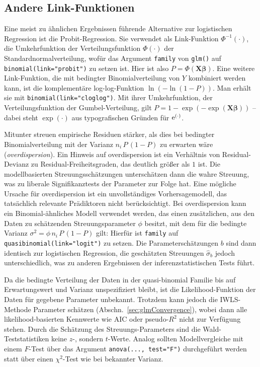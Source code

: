 \subsection{Andere Link-Funktionen}
\label{sec:glmOtherLink}

Eine meist zu ähnlichen Ergebnissen führende Alternative zur logistischen Regression ist die Probit-Regression. Sie verwendet als Link-Funktion $\Phi^{-1}(\cdot)$, die Umkehrfunktion der Verteilungsfunktion $\Phi(\cdot)$ der Standardnormalverteilung, wofür das Argument \lstinline!family! von \lstinline!glm()! auf \lstinline!binomial(link="probit")! zu setzen ist. Hier ist also $P = \Phi(\bm{X} \bm{\beta})$. Eine weitere Link-Funktion, die mit bedingter Binomialverteilung von $Y$ kombiniert werden kann, ist die komplementäre log-log-Funktion $\ln(-\ln(1-P))$. Man erhält sie mit \lstinline!binomial(link="cloglog")!. Mit ihrer Umkehrfunktion, der Verteilungsfunktion der Gumbel-Verteilung, gilt $P = 1 - \exp(-\exp(\bm{X} \bm{\beta}))$ -- dabei steht $\exp(\cdot)$ aus typografischen Gründen für ${\mathrm{e}}^{(\cdot)}$.

Mitunter streuen empirische Residuen stärker, als dies bei bedingter Binomialverteilung mit der Varianz $n_{i} \, P \, (1-P)$ zu erwarten wäre (\emph{overdispersion}). Ein Hinweis auf overdispersion ist ein Verhältnis von Residual-Devianz zu Residual-Freiheitsgraden, das deutlich größer als $1$ ist. Die modellbasierten Streuungsschätzungen unterschätzen dann die wahre Streuung, was zu liberale Signifikanztests der Parameter zur Folge hat. Eine mögliche Ursache für overdispersion ist ein unvollständiges Vorhersagemodell, das tatsächlich relevante Prädiktoren nicht berücksichtigt. Bei overdispersion kann ein Binomial-ähnliches Modell verwendet werden, das einen zusätzlichen, aus den Daten zu schätzenden Streuungsparameter $\phi$ besitzt, mit dem für die bedingte Varianz $\sigma^{2} = \phi \, n_{i} \, P \, (1-P)$ gilt: Hierfür ist \lstinline!family! auf \lstinline!quasibinomial(link="logit")! zu setzen. Die Parameterschätzungen $b$ sind dann identisch zur logistischen Regression, die geschätzten Streuungen $\hat{\sigma}_{b}$ jedoch unterschiedlich, was zu anderen Ergebnissen der inferenzstatistischen Tests führt.

Da die bedingte Verteilung der Daten in der quasi-binomial Familie bis auf Erwartungswert und Varianz unspezifiziert bleibt, ist die Likelihood-Funktion der Daten für gegebene Parameter unbekannt. Trotzdem kann jedoch die IWLS-Methode Parameter schätzen (Abschn.\ \ref{sec:glmConvergence}), wobei dann alle likelihood-basierten Kennwerte wie AIC oder pseudo-$R^{2}$ nicht zur Verfügung stehen. Durch die Schätzung des Streuungs-Parameters sind die Wald-Teststatistiken keine $z$-, sondern $t$-Werte. Analog sollten Modellvergleiche mit einem $F$-Test über das Argument \lstinline!anova(..., test="F")! durchgeführt werden statt über einen $\chi^{2}$-Test wie bei bekannter Varianz.

